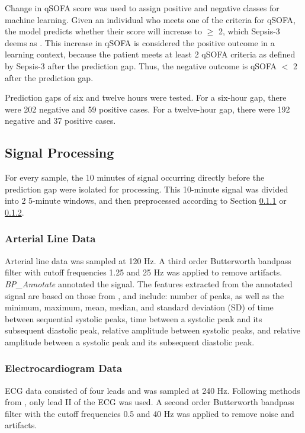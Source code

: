 Change in qSOFA score was used to assign positive and negative classes for machine learning. Given an individual who meets one of the criteria for qSOFA, the model predicts whether their score will increase to $\geq$ 2, which Sepsis-3 deems as  \cite{sepsis-3}. This increase in qSOFA is considered the positive outcome in a learning context, because the patient meets at least 2 qSOFA criteria as defined by Sepsis-3 after the prediction gap. Thus, the negative outcome is qSOFA $<$ 2 after the prediction gap.

Prediction gaps of six and twelve hours were tested. For a six-hour gap, there were 202 negative and 59 positive cases. For a twelve-hour gap, there were 192 negative and 37 positive cases.

\subsection{Signal Processing} \label{sec:methods_sigproc}
For every sample, the 10 minutes of signal occurring directly before the prediction gap were isolated for processing. This 10-minute signal was divided into 2 5-minute windows, and then preprocessed according to Section \ref{sec:methods_art_data} or \ref{sec:methods_ecg_data}.

\subsubsection{Arterial Line Data} \label{sec:methods_art_data}
Arterial line data was sampled at 120 Hz. A third order Butterworth bandpass filter with cutoff frequencies 1.25 and 25 Hz was applied to remove artifacts. \textit{BP\_Annotate} \cite{laurin_bp_annotate_2017} annotated the signal. The features extracted from the annotated signal are based on those from \cite{luo_severity_2012, hernandez_multimodal_2021}, and include: number of peaks, as well as the minimum, maximum, mean, median, and standard deviation (SD) of time between sequential systolic peaks, time between a systolic peak and its subsequent diastolic peak, relative amplitude between systolic peaks, and relative amplitude between a systolic peak and its subsequent diastolic peak.

\subsubsection{Electrocardiogram Data} \label{sec:methods_ecg_data}
ECG data consisted of four leads and was sampled at 240 Hz. Following methods from \cite{belle_signal_2016}, only lead II of the ECG was used. A second order Butterworth bandpass filter with the cutoff frequencies 0.5 and 40 Hz was applied to remove noise and artifacts.

